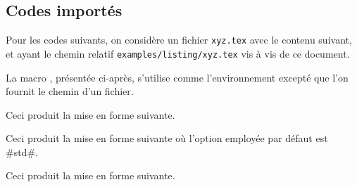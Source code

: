 \documentclass[10pt, a4paper]{article}
\begin{document}

\subsection{Codes importés}

Pour les codes suivants, on considère un fichier \verb+xyz.tex+ avec le contenu suivant, et ayant le chemin relatif \verb+examples/listing/xyz.tex+ vis à vis de ce document.


\medskip

La macro  , présentée ci-après, s'utilise comme l'environnement  excepté que l'on fournit le chemin d'un fichier.




\begin{bdocexa}
    \leavevmode

    \begin{bdoclatex}[code]
    \end{bdoclatex}

    Ceci produit la mise en forme suivante.

\end{bdocexa}




\begin{bdocexa}[À la suite]
    \leavevmode

    \begin{bdoclatex}[code]
    \end{bdoclatex}

    Ceci produit la mise en forme suivante où l'option employée par défaut est \bdocinlatex#std#.

\end{bdocexa}




\begin{bdocexa}
    \leavevmode

    \begin{bdoclatex}[code]
\bdoclatexinput[code]xyz.tex}
    \end{bdoclatex}

    Ceci produit la mise en forme suivante.

\end{bdocexa}
\end{document}
